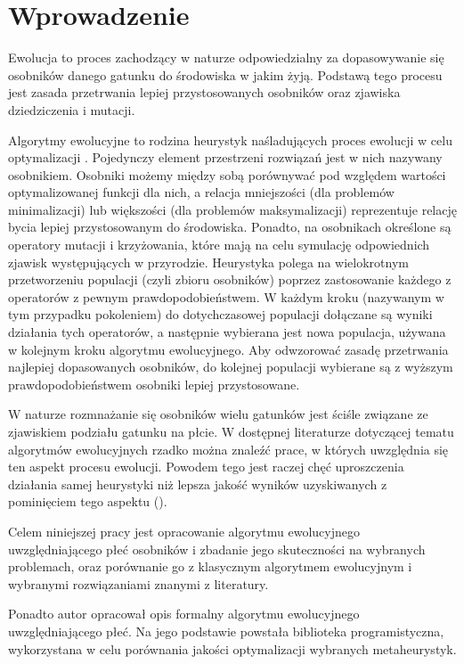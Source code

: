 \documentclass[../main.tex]{subfiles}
\begin{document}
\chapter*{Wprowadzenie}
Ewolucja to proces zachodzący w naturze odpowiedzialny za dopasowywanie się osobników danego gatunku do środowiska w jakim żyją.
Podstawą tego procesu jest zasada przetrwania lepiej przystosowanych osobników oraz zjawiska dziedziczenia i mutacji.

Algorytmy ewolucyjne to rodzina heurystyk naśladujących proces ewolucji w celu optymalizacji \cite{davis1991handbook}.
Pojedynczy element przestrzeni rozwiązań jest w nich nazywany osobnikiem.
Osobniki możemy między sobą porównywać pod względem wartości optymalizowanej funkcji dla nich, a relacja mniejszości (dla problemów minimalizacji) lub większości (dla problemów maksymalizacji) reprezentuje relację bycia lepiej przystosowanym do środowiska.
Ponadto, na osobnikach określone są operatory mutacji i krzyżowania, które mają na celu symulację odpowiednich zjawisk występujących w przyrodzie.
Heurystyka polega na wielokrotnym przetworzeniu populacji (czyli zbioru osobników) poprzez zastosowanie każdego z operatorów z pewnym prawdopodobieństwem.
W każdym kroku (nazywanym w tym przypadku pokoleniem) do dotychczasowej populacji dołączane są wyniki działania tych operatorów, a następnie wybierana jest nowa populacja, używana w kolejnym kroku algorytmu ewolucyjnego.
Aby odwzorować zasadę przetrwania najlepiej dopasowanych osobników, do kolejnej populacji wybierane są z wyższym prawdopodobieństwem osobniki lepiej przystosowane.

W naturze rozmnażanie się osobników wielu gatunków jest ściśle związane ze zjawiskiem podziału gatunku na płcie.
W dostępnej literaturze dotyczącej tematu algorytmów ewolucyjnych rzadko można znaleźć prace, w których uwzględnia się ten aspekt procesu ewolucji.
Powodem tego jest raczej chęć uproszczenia działania samej heurystyki niż lepsza jakość wyników uzyskiwanych z pominięciem tego aspektu (\cite{GGA, SexualGA}).

Celem niniejszej pracy jest opracowanie algorytmu ewolucyjnego uwzględniającego płeć osobników i zbadanie jego skuteczności na wybranych problemach, oraz porównanie go z klasycznym algorytmem ewolucyjnym i wybranymi rozwiązaniami znanymi z literatury.

Ponadto autor opracował opis formalny algorytmu ewolucyjnego uwzględniającego płeć.
Na jego podstawie powstała biblioteka programistyczna, wykorzystana w celu porównania jakości optymalizacji wybranych metaheurystyk.
\end{document}
